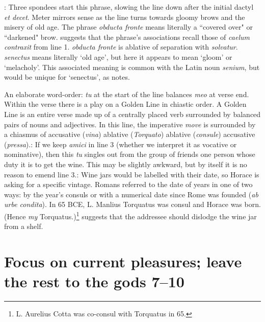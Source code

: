 
: Three spondees start this phrase,
slowing the line down after the initial dactyl \textit{et decet}.  Meter
mirrors sense as the line turns towards gloomy brows and the misery of old age.
The phrase \textit{obducta fronte} means literally a ``covered over" or
``darkened" brow.  \citet[217]{mankin1995} suggests that the phrase's
associations recall those of \textit{caelum contraxit} from line 1.
\textit{obducta fronte} is ablative of separation with \textit{solvatur}.
\textit{senectus} means literally `old age', but here it appears to mean
`gloom' or `melacholy'.  This associated meaning is common with the Latin noun
\textit{senium}, but would be unique for `senectus', as \citet[217]{mankin1995}
notes.


An elaborate word-order: \textit{tu} at the start of the line balances
\textit{meo} at verse end. Within the verse there is a play on a Golden Line in
chiastic order.  A Golden Line is an entire verse made up of a centrally placed
verb surrounded by balanced pairs of nouns and adjectives.  In this line, the
imperative \textit{move} is surrounded by a chiasmus of accusative
(\textit{vina}) ablative (\textit{Torquato}) ablative (\textit{consule})
accusative (\textit{pressa}).\indent{}: If we keep \textit{amici} in line
3 (whether we interpret it as vocative or nominative), then this \textit{tu}
singles out from the group of friends one person whose duty it is to get the
wine.  This may be slightly awkward, but by itself it is no reason to emend
line 3.\indent{}: Wine jars would be
labelled with their date, so Horace is asking for a specific vintage.  Romans
referred to the date of years in one of two ways: by the year's consuls or with
a numerical date since Rome was founded (\textit{ab urbe condita}).  In 65 BCE,
L. Manlius Torquatus was consul and Horace was born.  (Hence \textit{my}
Torquatus.)\footnote{L. Aurelius Cotta was co-consul with Torquatus in
65.}\indent{} suggests that the addressee should dislodge the wine jar
from a shelf.

\section*{Focus on current pleasures; leave the rest to the gods 7--10}

